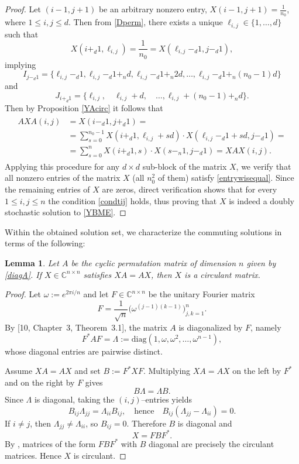 \documentclass{article}
\newtheorem{lemma}{Lemma}[section]
\theoremstyle{definition}\newtheorem{example}{Example}[section]
\begin{document}
\begin{proof}
		
		Let $(i-1,j+1)$ be an arbitrary nonzero entry, $X(i-1,j+1)=\frac{1}{n_0}$, where $1\leq i,j\leq d$. Then from \eqref{Dperm}, there exists a unique $\ell_{i,j}\in\{1,\ldots,d\}$ such that $$X(i+_d1,\ell_{i,j})=\frac{1}{n_0}=X(\ell_{i,j}-_d1,j-_d1),$$
		implying
		$$I_{j-_d1}=\{\ell_{i,j}-_d1,\ell_{i,j}-_d1+_n d, \ell_{i,j}-_d1+_n 2d,\ldots, \ell_{i,j}-_d1+_n (n_0-1)d\}$$
		and
		$$J_{i+_d1}=\{\ell_{i,j},\quad \ell_{i,j}+d,\quad\ldots,\ell_{i,j}+(n_0-1)+_nd\}.$$
		Then by Proposition \ref{YAcirc} it follows that
		\begin{eqnarray}
			\label{entrywisequal}
			\begin{aligned}
				AXA(i,j)&=X(i-_d1,j+_d 1)=\\
				&=\sum_{s=0}^{n_0-1}X(i+_d1, \ell_{i,j}+sd)\cdot X(\ell_{i,j}-_d1+sd,j-_d1)=\\
				&=\sum_{s=0}^n X(i+_d1,s)\cdot X(s-_n1,j-_d1)=XAX(i,j).
		\end{aligned}\end{eqnarray}
		Applying this procedure for any $d\times d$ sub-block of the matrix $X$, we verify that all nonzero entries of the matrix $X$ (all $n_0^2$ of them) satisfy \eqref{entrywisequal}. Since the remaining entries of $X$ are zeros, direct verification shows that for every $1\leq i,j\leq n$ the condition \eqref{condtij} holds, thus proving that $X$ is indeed a doubly stochastic solution to \eqref{YBME}.
	\end{proof}
	Within the obtained solution set, we characterize the commuting solutions in terms of the following:
	\begin{lemma}\label{lem:commutant_cyclic_is_circulant}
		Let $A$ be the cyclic permutation matrix of dimension $n$ given by \eqref{diagA}.
		If $X\in\mathbb{C}^{n\times n}$ satisfies $XA=AX$, then $X$ is a circulant matrix.
	\end{lemma}
	
	\begin{proof}
		Let $\omega:=e^{2\pi i/n}$ and let $F\in\mathbb{C}^{n\times n}$ be the unitary Fourier matrix
		\[
		F=\frac1{\sqrt n}\big(\omega^{(j-1)(k-1)}\big)_{j,k=1}^n .
		\]
		By [10, Chapter~3, Theorem~3.1], the matrix $A$ is diagonalized by $F$, namely
		\[
		F^*AF=\Lambda:=\mathrm{diag}(1,\omega,\omega^2,\dots,\omega^{n-1}),
		\]
		whose diagonal entries are pairwise distinct.
		
		Assume $XA=AX$ and set $B:=F^*XF$. Multiplying $XA=AX$ on the left by $F^*$ and on the right by $F$
		gives
		\[
		B\Lambda=\Lambda B.
		\]
		Since $\Lambda$ is diagonal, taking the $(i,j)$--entries yields
		\[
		B_{ij}\Lambda_{jj}=\Lambda_{ii}B_{ij},
		\quad\text{hence}\quad
		B_{ij}(\Lambda_{jj}-\Lambda_{ii})=0.
		\]
		If $i\neq j$, then $\Lambda_{jj}\neq\Lambda_{ii}$, so $B_{ij}=0$. Therefore $B$ is diagonal and
		\[
		X=FBF^*.
		\]
		By \cite[Chapter $3$, Theorem $3.1$]{RMG}, matrices of the form $FBF^*$ with $B$ diagonal are precisely the
		circulant matrices. Hence $X$ is circulant.
	\end{proof}
	
\end{document}
